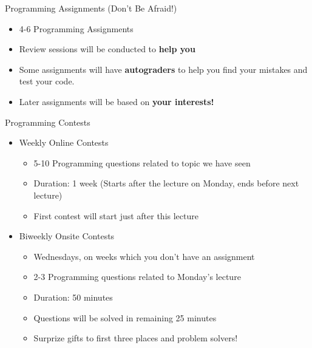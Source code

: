 		\begin{frame}{Programming Assignments (Don't Be Afraid!)}
			\begin{itemize}
				\LARGE
				\item 4-6 Programming Assignments
				\item Review sessions will be conducted to \textbf{help you}
				\item Some assignments will have \textbf{autograders} to help you find your mistakes and test your code.
				\item Later assignments will be based on \textbf{your interests!}
			\end{itemize}

			\begin{center}
			\end{center}
			\LARGE
			
		\end{frame}

		\begin{frame}{Programming Contests}
			\begin{itemize}
				\LARGE
				\item Weekly Online Contests
					\begin{itemize}
						\Large
						\item 5-10 Programming questions related to topic we have seen
						\item Duration: 1 week (Starts after the lecture on Monday, ends before next lecture)
						\item First contest will start just after this lecture
					\end{itemize}
				\item Biweekly Onsite Contests
					\begin{itemize}
						\Large
						\item Wednesdays, on weeks which you don't have an assignment
						\item 2-3 Programming questions related to Monday's lecture
						\item Duration: 50 minutes
						\item Questions will be solved in remaining 25 minutes
						\item Surprize gifts to first three places and problem solvers!
					\end{itemize}
			\end{itemize}
		\end{frame}

